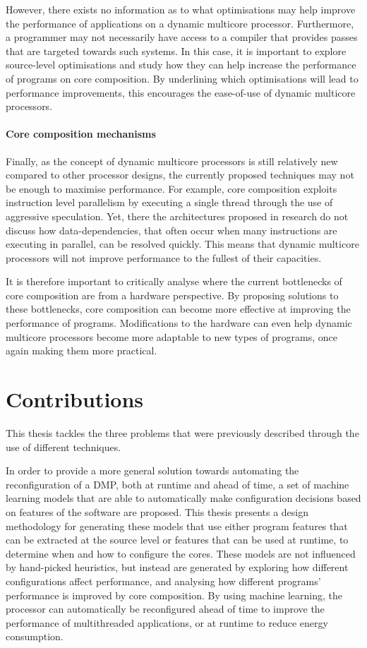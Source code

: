 However, there exists no information as to what optimisations may help improve the performance of applications on a dynamic multicore processor.
Furthermore, a programmer may not necessarily have access to a compiler that provides passes that are targeted towards such systems.
In this case, it is important to explore source-level optimisations and study how they can help increase the performance of programs on core composition.
By underlining which optimisations will lead to performance improvements, this encourages the ease-of-use of dynamic multicore processors.

\paragraph*{Core composition mechanisms} 
Finally, as the concept of dynamic multicore processors is still relatively new compared to other processor designs, the currently proposed techniques may not be enough to maximise performance.
For example, core composition exploits instruction level parallelism by executing a single thread through the use of aggressive speculation.
Yet, there the architectures proposed in research do not discuss how data-dependencies, that often occur when many instructions are executing in parallel, can be resolved quickly.
This means that dynamic multicore processors will not improve performance to the fullest of their capacities.

It is therefore important to critically analyse where the current bottlenecks of core composition are from a hardware perspective.
By proposing solutions to these bottlenecks, core composition can become more effective at improving the performance of programs.
Modifications to the hardware can even help dynamic multicore processors become more adaptable to new types of programs, once again making them more practical.


\section{Contributions}
This thesis tackles the three problems that were previously described through the use of different techniques.

In order to provide a more general solution towards automating the reconfiguration of a DMP, both at runtime and ahead of time, a set of machine learning models that are able to automatically make configuration decisions based on features of the software are proposed.
This thesis presents a design methodology for generating these models that use either program features that can be extracted at the source level or features that can be used at runtime, to determine when and how to configure the cores.
These models are not influenced by hand-picked heuristics, but instead are generated by exploring how different configurations affect performance, and analysing how different programs' performance is improved by core composition.
By using machine learning, the processor can automatically be reconfigured ahead of time to improve the performance of multithreaded applications, or at runtime to reduce energy consumption.

